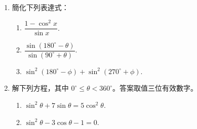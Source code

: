 \documentclass[11pt]{article}
\begin{document}
\begin{enumerate}
        \pagebreak
        \item 簡化下列表達式：\begin{enumerate}
            \item $\dfrac{1-\cos^2{x}}{\sin{x}}$.
            \item $\dfrac{\sin(180^\circ-\theta)}{\sin(90^\circ+\theta)}$.
            \item $\sin^2(180^\circ-\phi)+\sin^2(270^\circ+\phi)$.
        \end{enumerate}

        \hrulefill

            \hrulefill

            \hrulefill
            
            \hrulefill
            
            \hrulefill
            
            \hrulefill
            
            \hrulefill
            
            \hrulefill
            
            \hrulefill
            
            \hrulefill

        \item 解下列方程，其中 $0^\circ\leq \theta< 360^\circ$。答案取值三位有效數字。\begin{enumerate}
            \item $\sin^2{\theta}+7\sin{\theta}=5\cos^2{\theta}$.
            \item $\sin^2{\theta}-3\cos{\theta}-1=0$.
        \end{enumerate}

        \hrulefill

        \hrulefill
            
        \hrulefill
        
        \hrulefill
        
        \hrulefill
        
        \hrulefill
        
        \hrulefill
        
        \hrulefill
        
        \hrulefill
        
        \hrulefill
        
        \hrulefill
        
        \hrulefill


\end{enumerate}
\end{document}
